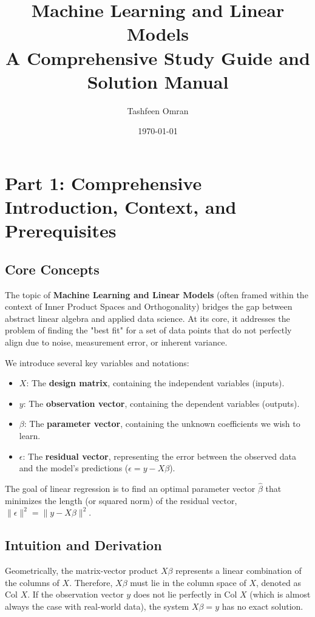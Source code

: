 \documentclass[11pt, letterpaper]{article}
\title{\textbf{Machine Learning and Linear Models \\ \Large A Comprehensive Study Guide and Solution Manual}}
\author{Tashfeen Omran}
\date{\today}
\theoremstyle{definition}
\theoremstyle{remark}
\begin{document}
\maketitle
\tableofcontents
\newpage

\section{Part 1: Comprehensive Introduction, Context, and Prerequisites}

\subsection{Core Concepts}
The topic of \textbf{Machine Learning and Linear Models} (often framed within the context of Inner Product Spaces and Orthogonality) bridges the gap between abstract linear algebra and applied data science. At its core, it addresses the problem of finding the "best fit" for a set of data points that do not perfectly align due to noise, measurement error, or inherent variance. 

We introduce several key variables and notations:
\begin{itemize}
    \item $X$: The \textbf{design matrix}, containing the independent variables (inputs).
    \item $y$: The \textbf{observation vector}, containing the dependent variables (outputs).
    \item $\beta$: The \textbf{parameter vector}, containing the unknown coefficients we wish to learn.
    \item $\epsilon$: The \textbf{residual vector}, representing the error between the observed data and the model's predictions ($\epsilon = y - X\beta$).
\end{itemize}
The goal of linear regression is to find an optimal parameter vector $\hat{\beta}$ that minimizes the length (or squared norm) of the residual vector, $\|\epsilon\|^2 = \|y - X\beta\|^2$.

\subsection{Intuition and Derivation}
Geometrically, the matrix-vector product $X\beta$ represents a linear combination of the columns of $X$. Therefore, $X\beta$ must lie in the column space of $X$, denoted as $\text{Col } X$. If the observation vector $y$ does not lie perfectly in $\text{Col } X$ (which is almost always the case with real-world data), the system $X\beta = y$ has no exact solution.
\end{document}
